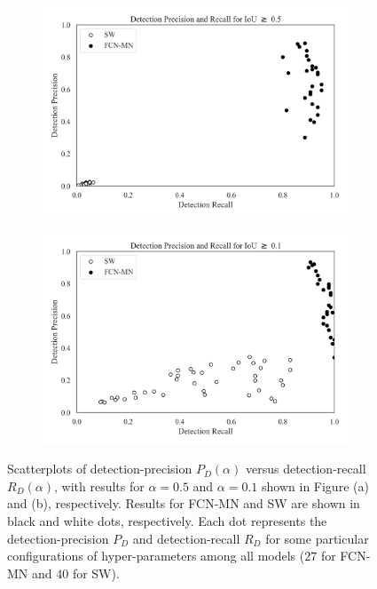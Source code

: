 \documentclass[a4paper,authoryear,review]{elsarticle}
\begin{document}
	
	\begin{figure}
		
		\centering
		\begin{subfigure}[b]{0.97\textwidth}
			\centering
			\includegraphics[width=\textwidth]{figures/Figure3-a.png}
			\caption{}
			\label{fig:Figure3-a}
		\end{subfigure}
		\hfill
		\begin{subfigure}[b]{0.97\textwidth}
			\centering
			\includegraphics[width=\textwidth]{figures/Figure3-b.png}
			\caption{}
			\label{fig:Figure3-b}
		\end{subfigure}
		\caption{
			Scatterplots of detection-precision $P_D(\alpha)$ versus detection-recall $R_D(\alpha)$, with  results for $\alpha=0.5$ and $\alpha=0.1$ shown in Figure (a) and (b), respectively. Results for FCN-MN and SW are shown in black and white dots, respectively. Each dot represents the detection-precision $P_D$ and detection-recall $R_D$ for some particular configurations of hyper-parameters among all models ($27$ for FCN-MN and $40$ for SW).
		}
		\label{fig:Figure3}
	\end{figure}
	
\end{document}
